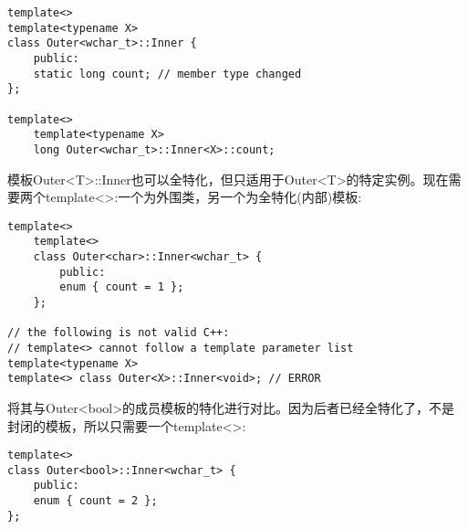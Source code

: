 \begin{lstlisting}[style=styleCXX]
template<>
template<typename X>
class Outer<wchar_t>::Inner {
	public:
	static long count; // member type changed
};

template<>
	template<typename X>
	long Outer<wchar_t>::Inner<X>::count;
\end{lstlisting}

模板Outer<T>::Inner也可以全特化，但只适用于Outer<T>的特定实例。现在需要两个template<>:一个为外围类，另一个为全特化(内部)模板:

\begin{lstlisting}[style=styleCXX]
template<>
	template<>
	class Outer<char>::Inner<wchar_t> {
		public:
		enum { count = 1 };
	};

// the following is not valid C++:
// template<> cannot follow a template parameter list
template<typename X>
template<> class Outer<X>::Inner<void>; // ERROR
\end{lstlisting}

将其与Outer<bool>的成员模板的特化进行对比。因为后者已经全特化了，不是封闭的模板，所以只需要一个template<>:

\begin{lstlisting}[style=styleCXX]
template<>
class Outer<bool>::Inner<wchar_t> {
	public:
	enum { count = 2 };
};
\end{lstlisting}
































